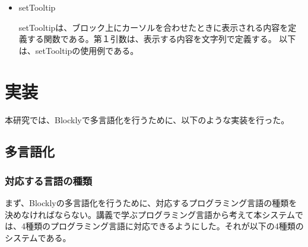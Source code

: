 \documentclass{eniepaper}
\begin{document}
\begin{itemize}

\item setTooltip

setTooltipは、ブロック上にカーソルを合わせたときに表示される内容を定義する関数である。第１引数は、表示する内容を文字列で定義する。
以下は、setTooltipの使用例である。


\end{itemize} 

   \chapter{実装}
   
本研究では、Blocklyで多言語化を行うために、以下のような実装を行った。
   
   \section{多言語化}
   
   \subsection{対応する言語の種類}
   
まず、Blocklyの多言語化を行うために、対応するプログラミング言語の種類を決めなければならない。講義で学ぶプログラミング言語から考えて本システムでは、4種類のプログラミング言語に対応できるようにした。それが以下の4種類のシステムである。
\end{document}

